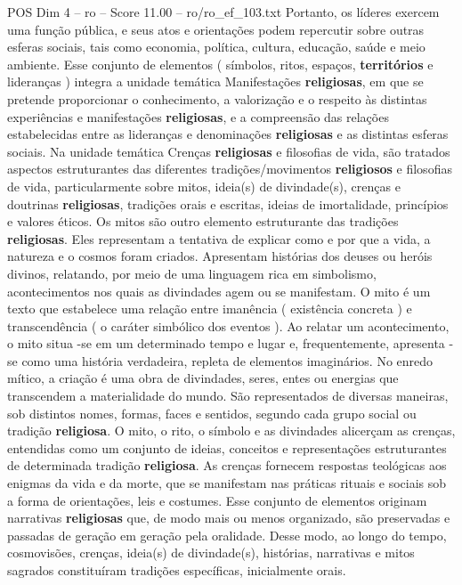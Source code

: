 \begin{textsample}{POS Dim 4 – ro – Score 11.00 – ro/ro\_ef\_103.txt}
Portanto, os líderes exercem uma função pública, e seus atos e orientações podem repercutir sobre outras esferas sociais, tais como economia, política, cultura, educação, saúde e meio ambiente.
Esse conjunto de elementos ( símbolos, ritos, espaços, \textbf{territórios} e lideranças ) integra a unidade temática Manifestações \textbf{religiosas}, em que se pretende proporcionar o conhecimento, a valorização e o respeito às distintas experiências e manifestações \textbf{religiosas}, e a compreensão das relações estabelecidas entre as lideranças e denominações \textbf{religiosas} e as distintas esferas sociais.
Na unidade temática Crenças \textbf{religiosas} e filosofias de vida, são tratados aspectos estruturantes das diferentes tradições/movimentos \textbf{religiosos} e filosofias de vida, particularmente sobre mitos, ideia(s) de divindade(s), crenças e doutrinas \textbf{religiosas}, tradições orais e escritas, ideias de imortalidade, princípios e valores éticos.
Os mitos são outro elemento estruturante das tradições \textbf{religiosas}.
Eles representam a tentativa de explicar como e por que a vida, a natureza e o cosmos foram criados.
Apresentam histórias dos deuses ou heróis divinos, relatando, por meio de uma linguagem rica em simbolismo, acontecimentos nos quais as divindades agem ou se manifestam.
O mito é um texto que estabelece uma relação entre imanência ( existência concreta ) e transcendência ( o caráter simbólico dos eventos ).
Ao relatar um acontecimento, o mito situa -se em um determinado tempo e lugar e, frequentemente, apresenta -se como uma história verdadeira, repleta de elementos imaginários.
No enredo mítico, a criação é uma obra de divindades, seres, entes ou energias que transcendem a materialidade do mundo.
São representados de diversas maneiras, sob distintos nomes, formas, faces e sentidos, segundo cada grupo social ou tradição \textbf{religiosa}.
O mito, o rito, o símbolo e as divindades alicerçam as crenças, entendidas como um conjunto de ideias, conceitos e representações estruturantes de determinada tradição \textbf{religiosa}.
As crenças fornecem respostas teológicas aos enigmas da vida e da morte, que se manifestam nas práticas rituais e sociais sob a forma de orientações, leis e costumes.
Esse conjunto de elementos originam narrativas \textbf{religiosas} que, de modo mais ou menos organizado, são preservadas e passadas de geração em geração pela oralidade.
Desse modo, ao longo do tempo, cosmovisões, crenças, ideia(s) de divindade(s), histórias, narrativas e mitos sagrados constituíram tradições específicas, inicialmente orais.

\end{textsample}
